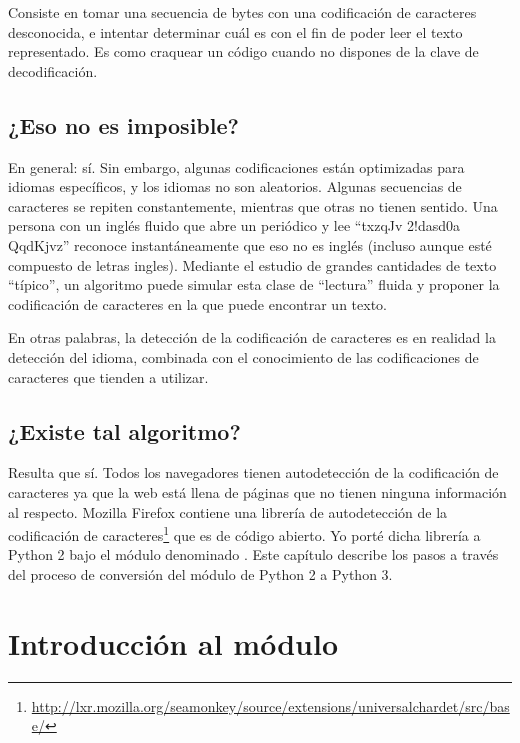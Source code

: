 Consiste en tomar una secuencia de bytes con una codificación de caracteres desconocida, e intentar determinar cuál es con el fin de poder leer el texto representado. Es como craquear un código cuando no dispones de la clave de decodificación.

\subsection{¿Eso no es imposible?}

En general: sí. Sin embargo, algunas codificaciones están optimizadas para idiomas específicos, y los idiomas no son aleatorios. Algunas secuencias de caracteres se repiten constantemente, mientras que otras no tienen sentido. Una persona con un inglés fluido que abre un periódico y lee “txzqJv 2!dasd0a QqdKjvz” reconoce instantáneamente que eso no es inglés (incluso aunque esté compuesto de letras ingles). Mediante el estudio de grandes cantidades de texto “típico”, un algoritmo puede simular esta clase de “lectura” fluida y proponer la codificación de caracteres en la que puede encontrar un texto.

En otras palabras, la detección de la codificación de caracteres es en realidad la detección del idioma, combinada con el conocimiento de las codificaciones de caracteres que tienden a utilizar.

\subsection{¿Existe tal algoritmo?}

Resulta que sí. Todos los navegadores tienen autodetección de la codificación de caracteres ya que la web está llena de páginas que no tienen ninguna información al respecto. Mozilla Firefox contiene una librería de autodetección de la codificación de caracteres\footnote{\href{http://lxr.mozilla.org/seamonkey/source/extensions/universalchardet/src/base/}{http://lxr.mozilla.org/seamonkey/source/extensions/universalchardet/src/base/}} que es de código abierto. Yo porté dicha librería a Python 2 bajo el módulo denominado . Este capítulo describe los pasos a través del proceso de conversión del módulo  de Python 2 a Python 3.

\section{Introducción al módulo }


